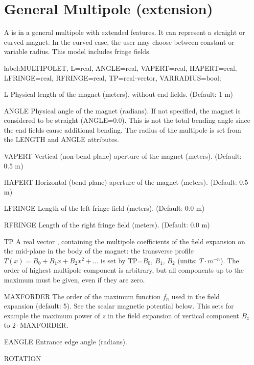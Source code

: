 \section{General Multipole (extension)}
\label{sec:multipoleT}
A  is in \opalt a general multipole with extended features. It can represent a straight or curved magnet. In the curved case, the user may choose between constant or variable radius. This model includes fringe fields. 
\begin{example}
label:MULTIPOLET, L=real, ANGLE=real, VAPERT=real, HAPERT=real,
      LFRINGE=real, RFRINGE=real, TP=real-vector, VARRADIUS=bool;
\end{example}
\begin{kdescription}
\item[L]
  Physical length of the magnet (meters), without end fields. (Default: 1 m)
\item[ANGLE]
  Physical angle of the magnet (radians). If not specified, the magnet is considered to be straight (ANGLE=0.0). This is not the total bending angle since the end fields cause additional bending. The radius of the multipole is set from the LENGTH and ANGLE attributes. 
\item[VAPERT]
  Vertical (non-bend plane) aperture of the magnet (meters). (Default: 0.5 m)
\item[HAPERT]
  Horizontal (bend plane) aperture of the magnet (meters). (Default: 0.5 m)
\item[LFRINGE]
  Length of the left fringe field (meters). (Default: 0.0 m)
\item[RFRINGE]
  Length of the right fringe field (meters). (Default: 0.0 m)
\item[TP]
  A real vector , containing the multipole coefficients of the field expansion on the mid-plane in the body of the magnet: the transverse profile $ T(x) = B_0 + B_1 x + B_2 x^2   + \dots $ is set by TP={$B_0$, $B_1$, $B_2$} (units: $ T \cdot m^{-n}$). The order of highest multipole component is arbitrary, but all components up to the maximum must be given, even if they are zero.
\item[MAXFORDER]
  The order of the maximum function $f_n$ used in the field expansion (default: 5). See the scalar magnetic potential below. This sets for example the maximum power of $z$ in the field expansion of vertical component $B_z$ to $2 \cdot \text{MAXFORDER} $.
\item[EANGLE]
  Entrance edge angle (radians).
\item[ROTATION]

\end{kdescription}

